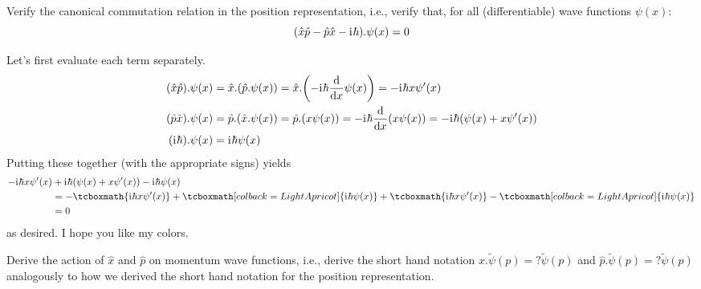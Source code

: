 \documentclass[boxes,pages]{homework}
\makeatletter
\newcommand{\iu}{\mathrm{i}\mkern1mu}
\numberwithin{@problem}{section}
\makeatother
\begin{document}
\setcounter{section}{5}

\begin{problem}
Verify the canonical commutation relation in the position representation, i.e., verify that, for all (differentiable) wave functions $\psi(x)$:
\[
	(\hat{x}\hat{p} - \hat{p}\hat{x} - \iu\hbar).\psi(x) = 0
\]
\end{problem}

\begin{solution}
	Let's first evaluate each term separately.
	\begin{align*}
		(\hat{x}\hat{p}).\psi(x) & = \hat{x}.(\hat{p}.\psi(x)) = \hat{x}.\qty(-\iu\hbar\dv{x}\psi(x)) = -\iu\hbar x\psi'(x)                                  \\
		(\hat{p}\hat{x}).\psi(x) & = \hat{p}.(\hat{x}.\psi(x)) = \hat{p}.\qty(x\psi(x)) = -\iu\hbar\dv{x}\qty(x\psi(x)) = -\iu\hbar\qty(\psi(x) + x\psi'(x)) \\
		(\iu\hbar).\psi(x)       & = \iu\hbar\psi(x)
	\end{align*}
	Putting these together (with the appropriate signs) yields
	\begin{align*}
		-\iu\hbar x\psi'(x) & + \iu\hbar\qty(\psi(x) + x\psi'(x)) - \iu\hbar\psi(x)                                                                                                                      \\
		                    & = -\tcboxmath{\iu\hbar x\psi'(x)} + \tcboxmath[colback=LightApricot]{\iu\hbar\psi(x)} + \tcboxmath{\iu\hbar x\psi'(x)} - \tcboxmath[colback=LightApricot]{\iu\hbar\psi(x)} \\
		                    & = 0
	\end{align*}
	as desired. I hope you like my colors.
\end{solution}

\begin{problem}
Derive the action of $\hat{x}$ and $\hat{p}$ on momentum wave functions, i.e., derive the short hand notation $\hat{x}.\tilde{\psi}(p) = ?\tilde{\psi}(p)$ and $\hat{p}.\tilde{\psi}(p) = ?\tilde{\psi}(p)$ analogously to how we derived the short hand notation for the position representation.
\end{problem}
\end{document}
